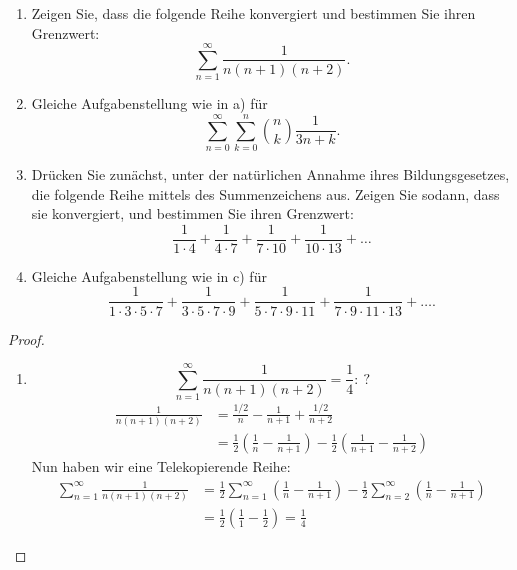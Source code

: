 \documentclass{../problemset}
\author{Michael van Straten}
\begin{document}
\maketitle

\begin{problem}
\begin{enumerate}
	\item Zeigen Sie, dass die folgende Reihe konvergiert und bestimmen Sie ihren Grenzwert:
	      \[
		      \sum_{n=1}^{\infty} \frac{1}{n(n + 1)(n + 2)}.
	      \]
	\item Gleiche Aufgabenstellung wie in a) für
	      \[
		      \sum_{n=0}^{\infty} \sum_{k=0}^{n} {n \choose k} \frac{1}{3n+k}.
	      \]
	\item Drücken Sie zunächst, unter der natürlichen Annahme ihres Bildungsgesetzes, die folgende Reihe mittels des Summenzeichens aus. Zeigen Sie sodann, dass sie konvergiert, und bestimmen Sie ihren Grenzwert:
	      \[
		      \frac{1}{1 \cdot 4 } + \frac{1}{4 \cdot 7 } + \frac{1}{7 \cdot 10} + \frac{1}{10 \cdot 13} + \ldots
	      \]
	\item Gleiche Aufgabenstellung wie in c) für
	      \[
		      \frac{1}{1 \cdot 3 \cdot 5 \cdot 7 } + \frac{1}{3 \cdot 5 \cdot 7 \cdot 9} + \frac{1}{5 \cdot 7 \cdot 9 \cdot 11} + \frac{1}{7 \cdot 9 \cdot 11 \cdot 13} + \ldots.
	      \]
\end{enumerate}
\begin{proof}
	\begin{enumerate}
		\item
		      \[
			      \sum_{n = 1}^{\infty}\frac{1}{n(n + 1)(n + 2)} = \frac{1}{4}:\ ?
		      \]
		      \begin{align}
			      \frac{1}{n(n + 1)(n + 2)} & = \frac{1/2}{n} - \frac{1}{n + 1} + \frac{1/2}{n + 2}                                                               \\
			                                & = \frac{1}{2}\left(\frac{1}{n} - \frac{1}{n + 1}\right) - \frac{1}{2}\left(\frac{1}{n + 1} - \frac{1}{n + 2}\right)
		      \end{align}
		      Nun haben wir eine Telekopierende Reihe:
		      \begin{align}
			      \sum_{n = 1}^{\infty}\frac{1}{n(n + 1)(n + 2)} & = \frac{1}{2}\sum_{n = 1}^{\infty}\left(\frac{1}{n} - \frac{1}{n + 1}\right) - \frac{1}{2}\sum_{n = 2}^{\infty}\left(\frac{1}{n} - \frac{1}{n + 1}\right) \\
			                                                     & = \frac{1}{2}\left(\frac{1}{1} - \frac{1}{2}\right) = \frac{1}{4}

\end{align}
\end{enumerate}
\end{proof}
\end{problem}
\end{document}
